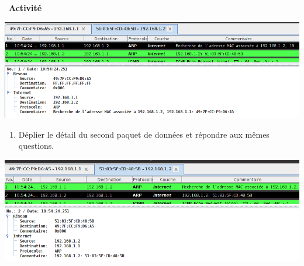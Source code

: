 \documentclass[
  11pt,
]{article}
\providecommand{\tightlist}{%
  \setlength{\itemsep}{0pt}\setlength{\parskip}{0pt}}
\newcounter{activite}
\newenvironment{activite}[1]
{\par \medskip   \noindent   \addtocounter{activite}{1}
\begin{bclogo}[arrondi =0.1,   noborder = true, logo=\bcvelo, marge=4]{~\textbf{Activité} \textbf{\theactivite} {\itshape #1} }  \par}
{
\end{bclogo}
 \par \bigskip }
\newcounter{def}
\begin{document}
\begin{activite}{}
\includegraphics{images/arp1.png}\\

\begin{enumerate}
\def\labelenumi{\arabic{enumi}.}
\setcounter{enumi}{4}
\tightlist
\item
  Déplier le détail du second paquet de données et répondre aux mêmes
  questions.
\end{enumerate}

\end{activite}

\includegraphics{images/arp2.png}\\
\end{document}
